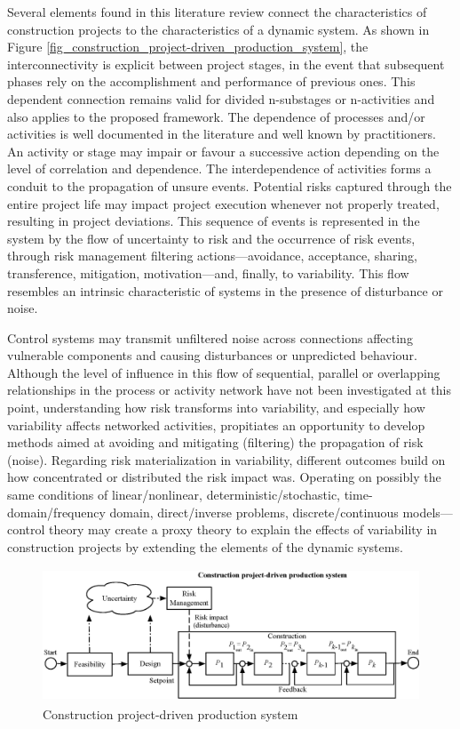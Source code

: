 \documentclass{article}
\begin{document}
Several elements found in this literature review connect the characteristics of construction projects to the characteristics of a dynamic system.
As shown in Figure \ref{fig_construction_project-driven_production_system}, the interconnectivity is explicit between project stages, in the event that subsequent phases rely on the accomplishment and performance of previous ones.
This dependent connection remains valid for divided n-substages or n-activities and also applies to the proposed framework.
The dependence of processes and/or activities is well documented in the literature and well known by practitioners.
An activity or stage may impair or favour a successive action depending on the level of correlation and dependence.
The interdependence of activities forms a conduit to the propagation of unsure events. Potential risks captured through the entire project life may impact project execution whenever not properly treated, resulting in project deviations.
This sequence of events is represented in the system by the flow of uncertainty to risk and the occurrence of risk events, through risk management filtering actions—avoidance, acceptance, sharing, transference, mitigation, motivation—and, finally, to variability.
This flow resembles an intrinsic characteristic of systems in the presence of disturbance or noise.

Control systems may transmit unfiltered noise across connections affecting vulnerable components and causing disturbances or unpredicted behaviour.
Although the level of influence in this flow of sequential, parallel or overlapping relationships in the process or activity network have not been investigated at this point, understanding how risk transforms into variability, and especially how variability affects networked activities, propitiates an opportunity to develop methods aimed at avoiding and mitigating (filtering) the propagation of risk (noise). Regarding risk materialization in variability, different outcomes build on how concentrated or distributed the risk impact was.
 Operating on possibly the same conditions of linear/nonlinear, deterministic/stochastic, time-domain/frequency domain, direct/inverse problems, discrete/continuous models---control theory may create a proxy theory to explain the effects of variability in construction projects by extending the elements of the dynamic systems.


\begin{figure}[htbp]
\centering
\includegraphics[height=150]{./Figures/Construction_project_driven_production_system.eps}
\caption{\label{fig:org2810aec}Construction project-driven production system}
\end{figure}
\end{document}
